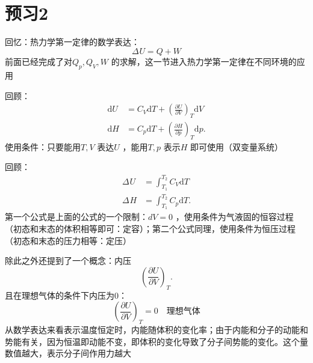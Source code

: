 \section*{预习2}%
\label{sec*:预习2}
回忆：热力学第一定律的数学表达：
\begin{equation}
    \label{eq:热力学第一定律}
    \Delta_\text{}U = Q+W 
\end{equation}
前面已经完成了对$Q_{p},Q_{V},W$ 的求解，这一节进入热力学第一定律在不同环境的应用

\begin{notation}
    回顾：
    \begin{align*}
        \mathrm{d}U &= C_{V}\mathrm{d}T + \left(\frac{\partial U}{\partial V}\right)_{T}\mathrm{d}V\\
        \mathrm{d}H &= C_{p}\mathrm{d}T + \left(\frac{\partial H}{\partial p}\right)_{T}\mathrm{d}p
    .\end{align*}
    使用条件：只要能用$T,V$ 表达$U$ ，能用$T,p$ 表示$H$ 即可使用（双变量系统）
\end{notation}
\begin{notation}
    回顾：
    \begin{align*}
        \Delta_\text{}U &= \int_{T_1}^{T_2} C_{V} \mathrm{d}T \\
        \Delta_\text{}H &= \int_{T_1}^{T_2} C_{p} \mathrm{d}T 
    .\end{align*}
    第一个公式是上面的公式的一个限制：$dV=0$ ，使用条件为气液固的恒容过程（初态和末态的体积相等即可：定容）；第二个公式同理，使用条件为恒压过程（初态和末态的压力相等：定压）
\end{notation}
除此之外还提到了一个概念：内压\[
    \left(\frac{\partial U}{\partial V}\right)_{T}
.\]
且在理想气体的条件下内压为0：
\begin{equation}
    \label{eq:理想气体内压为0}
    \left(\frac{\partial U}{\partial V}\right)_{T} = 0\quad \text{理想气体} 
\end{equation}
从数学表达来看表示温度恒定时，内能随体积的变化率；由于内能和分子的动能和势能有关，因为恒温即动能不变，即体积的变化导致了分子间势能的变化。这个量数值越大，表示分子间作用力越大

